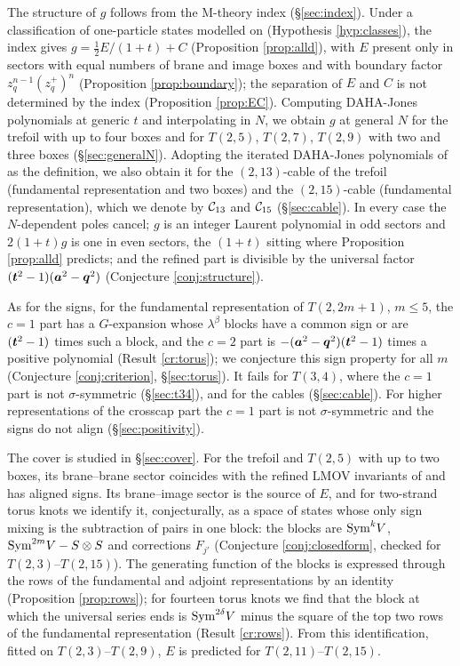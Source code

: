 The structure of $g$ follows from the M-theory index (\S\ref{sec:index}). Under a classification of one-particle states modelled on \cite{AgSc12} (Hypothesis \ref{hyp:classes}), the index gives $g = \tfrac12 E/(1+t) + C$ (Proposition \ref{prop:alld}), with $E$ present only in sectors with equal numbers of brane and image boxes and with boundary factor $z_q^{n-1}(z_q^+)^n$ (Proposition \ref{prop:boundary}); the separation of $E$ and $C$ is not determined by the index (Proposition \ref{prop:EC}). Computing DAHA-Jones polynomials at generic $t$ and interpolating in $N$, we obtain $g$ at general $N$ for the trefoil with up to four boxes and for $T(2,5)$, $T(2,7)$, $T(2,9)$ with two and three boxes (\S\ref{sec:generalN}). Adopting the iterated DAHA-Jones polynomials of \cite{CD14} as the definition, we also obtain it for the $(2,13)$-cable of the trefoil (fundamental representation and two boxes) and the $(2,15)$-cable (fundamental representation), which we denote by $\mathcal{C}_{13}$ and $\mathcal{C}_{15}$ (\S\ref{sec:cable}). In every case the $N$-dependent poles cancel; $g$ is an integer Laurent polynomial in odd sectors and $2(1+t)g$ is one in even sectors, the $(1+t)$ sitting where Proposition \ref{prop:alld} predicts; and the refined part is divisible by the universal factor $(\bm{t}^2 - 1)(\bm{a}^2 - \bm{q}^2)$ (Conjecture \ref{conj:structure}).

As for the signs, for the fundamental representation of $T(2,2m+1)$, $m \le 5$, the $c = 1$ part has a $G$-expansion whose $\lambda^\beta$ blocks have a common sign or are $(\bm{t}^2-1)$ times such a block, and the $c = 2$ part is $-(\bm{a}^2 - \bm{q}^2)(\bm{t}^2 - 1)$ times a positive polynomial (Result \ref{cr:torus}); we conjecture this sign property for all $m$ (Conjecture \ref{conj:criterion}, \S\ref{sec:torus}). It fails for $T(3,4)$, where the $c = 1$ part is not $\sigma$-symmetric (\S\ref{sec:t34}), and for the cables (\S\ref{sec:cable}). For higher representations of the crosscap part the $c = 1$ part is not $\sigma$-symmetric and the signs do not align (\S\ref{sec:positivity}).

The cover is studied in \S\ref{sec:cover}. For the trefoil and $T(2,5)$ with up to two boxes, its brane--brane sector coincides with the refined LMOV invariants of \cite{KN17} and has aligned signs. Its brane--image sector is the source of $E$, and for two-strand torus knots we identify it, conjecturally, as a space of states whose only sign mixing is the subtraction of pairs in one block: the blocks are $\mathrm{Sym}^kV$, $\mathrm{Sym}^{2m}V - S\otimes S$ and corrections $F_{j'}$ (Conjecture \ref{conj:closedform}, checked for $T(2,3)$--$T(2,15)$). The generating function of the blocks is expressed through the rows of the fundamental and adjoint representations by an identity (Proposition \ref{prop:rows}); for fourteen torus knots we find that the block at which the universal series ends is $\mathrm{Sym}^{2\delta}V$ minus the square of the top two rows of the fundamental representation (Result \ref{cr:rows}). From this identification, fitted on $T(2,3)$--$T(2,9)$, $E$ is predicted for $T(2,11)$--$T(2,15)$.

